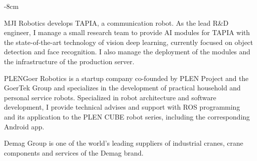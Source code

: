 \documentclass[10pt,a4paper]{altacv}
\begin{document}

\begin{adjustwidth}{}{-8cm}
\makecvheader
\end{adjustwidth}


MJI Robotics develops TAPIA, a communication robot. As the lead R\&D engineer, I manage a small research team to provide AI modules for TAPIA with the state-of-the-art technology of vision deep learning, currently focused on object detection and face recognition. I also manage the deployment of the modules and the infrastructure of the production server.

\divider

PLENGoer Robotics is a startup company co-founded by PLEN Project and the GoerTek Group and specializes in the development of practical household and personal service robots.
Specialized in robot architecture and software development, I provide technical advises and support with ROS programming and its application to the PLEN CUBE robot series, including the corresponding Android app.

\divider

Demag Group is one of the world's leading suppliers of industrial cranes, crane components and services of the Demag brand.
\end{document}
